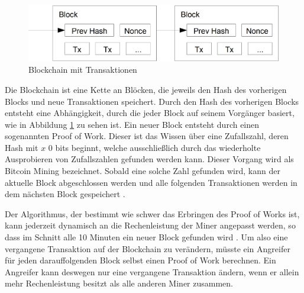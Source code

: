 \documentclass[
	fontsize=11pt,
	headings=small,
	parskip=half,           %
	bibliography=totoc,
	numbers=noenddot,       %
	open=any,               %
]{scrreprt}
\begin{document}
\begin{figure}[h]
    \centering
    \caption{Blockchain mit Transaktionen \cite{btc-nakamoto2008bitcoin}}
    \label{fig:btc_blockchain}
    \includegraphics[width=0.5\linewidth]{BitcoinBlockchain.png}
\end{figure}

Die Blockchain ist eine Kette an Blöcken, die jeweils den Hash des vorherigen Blocks und neue Transaktionen speichert. Durch den Hash des vorherigen Blocks entsteht eine Abhängigkeit, durch die jeder Block auf seinem Vorgänger basiert, wie in Abbildung \ref{fig:btc_blockchain} zu sehen ist. Ein neuer Block entsteht durch einen sogenannten Proof of Work. Dieser ist das Wissen über eine Zufallszahl, deren Hash mit $x$ 0 bits beginnt, welche ausschließlich durch das wiederholte Ausprobieren von Zufallszahlen gefunden werden kann. Dieser Vorgang wird als Bitcoin Mining bezeichnet. Sobald eine solche Zahl gefunden wird, kann der aktuelle Block abgeschlossen werden und alle folgenden Transaktionen werden in dem nächsten Block gespeichert \cite{btc-nakamoto2008bitcoin}.

Der Algorithmus, der bestimmt wie schwer das Erbringen des Proof of Works ist, kann jederzeit dynamisch an die Rechenleistung der Miner angepasst werden, so dass im Schnitt alle 10 Minuten ein neuer Block gefunden wird \cite{btc-Zaghloul2019Bitcoin}. Um also eine vergangene Transaktion auf der Blockchain zu verändern, müsste ein Angreifer für jeden darauffolgenden Block selbst einen Proof of Work berechnen. Ein Angreifer kann deswegen nur eine vergangene Transaktion ändern, wenn er allein mehr Rechenleistung besitzt als alle anderen Miner zusammen.
\end{document}
